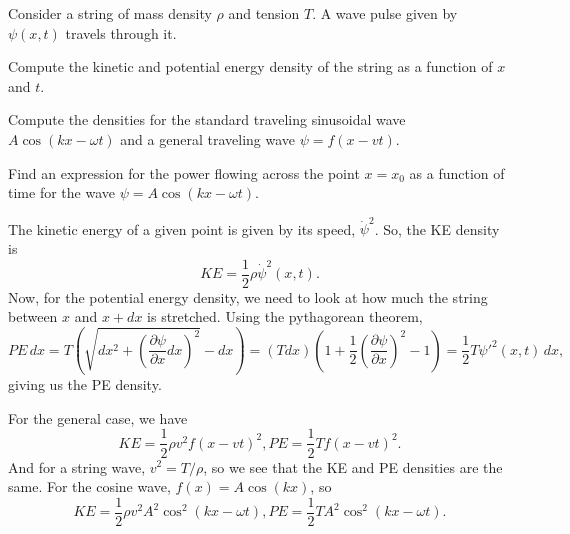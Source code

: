 \documentclass[11pt]{scrartcl}
\begin{document}


\begin{prob}
    Consider a string of mass density $\rho$ and tension $T$. A wave pulse given by $\psi(x,t)$ travels through it.
    \begin{anum}
        \item Compute the kinetic and potential energy density of the string as a function of $x$ and $t$. 
        \item Compute the densities for the standard traveling sinusoidal wave $A \cos (kx - \omega t)$ and a general traveling wave $\psi = f(x-vt)$.
        \item Find an expression for the power flowing across the point $x = x_0$ as a function of time for the wave $\psi = A \cos (kx - \omega t)$.
    \end{anum}
\end{prob}
\begin{alphasol}
    \item The kinetic energy of a given point is given by its speed, $\dot \psi^2$. So, the KE density is
    $$KE = \frac 12 \rho \dot \psi ^2 (x,t).$$
    Now, for the potential energy density, we need to look at how much the string between $x$ and $x+dx$ is stretched. Using the pythagorean theorem,
    $$PE \, dx = T\left(\sqrt{dx^2 + \left(\frac{\partial \psi}{\partial x}dx\right)^2} - dx\right) = (Tdx) \left(1 + \frac 12 \left(\frac{\partial \psi}{\partial x}\right)^2 - 1\right) = \frac 12 T \psi'^2(x,t)\, dx,$$
    giving us the PE density.
    \item For the general case, we have
    $$KE = \frac 12 \rho v^2 f(x-vt)^2, PE = \frac 12 T f(x-vt)^2.$$
    And for a string wave, $v^2 = T/\rho$, so we see that the KE and PE densities are the same. For the cosine wave, $f(x) = A\cos(kx)$, so
    $$KE = \frac 12 \rho v^2 A^2 \cos^2(kx - \omega t), PE = \frac 12 T A^2 \cos^2(kx - \omega t).$$
\end{alphasol}


\end{document}
